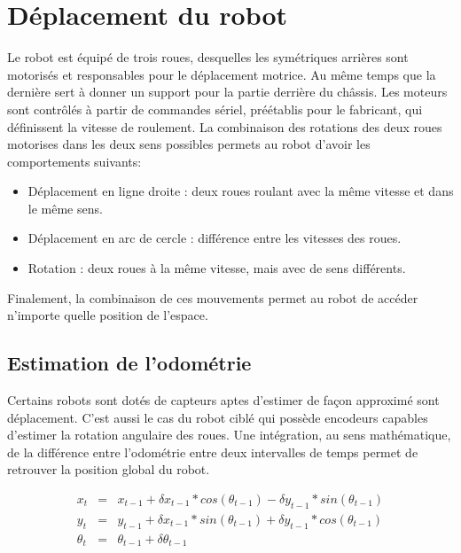 \section{Déplacement du robot}

Le robot est équipé de trois roues, desquelles les symétriques
arrières sont motorisés et responsables pour le déplacement
motrice. Au même temps que la dernière sert à donner un support pour
la partie derrière du châssis. Les moteurs sont contrôlés à
partir de commandes sériel, préétablis pour le fabricant, qui
définissent la vitesse de roulement. La combinaison des rotations
des deux roues motorises dans les deux sens possibles permets au
robot d'avoir les comportements suivants:

\begin {itemize}
\item Déplacement en ligne droite : deux roues roulant avec la même vitesse et dans le même sens.

\item Déplacement en arc de cercle : différence entre les vitesses des roues.

\item Rotation : deux roues à la même vitesse, mais avec de sens différents.
\end{itemize}


Finalement, la combinaison de ces mouvements permet au robot de
accéder n'importe quelle position de l’espace.

\subsection{Estimation de l'odométrie}

Certains robots sont dotés de capteurs aptes d'estimer de façon
approximé sont déplacement. C'est aussi le cas du robot ciblé qui
possède encodeurs capables d'estimer la rotation angulaire des
roues. Une intégration, au sens mathématique, de la différence entre
l'odométrie entre deux intervalles de temps permet de retrouver la
position global du robot.

\begin{equation*}
	\begin{array}{rcl}
		x_t &=& x_{t-1} + \delta x_{t-1} * cos(\theta_{t-1}) - \delta y_{t-1} * sin(\theta_{t-1}) \\
		y_t &=& y_{t-1} + \delta x_{t-1} * sin(\theta_{t-1}) + \delta y_{t-1} * cos(\theta_{t-1}) \\
		\theta_t &=& \theta_{t-1} + \delta\theta_{t-1}
	\end{array}
\end{equation*}
